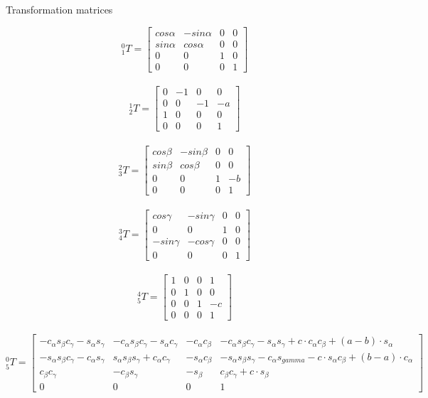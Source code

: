 \documentclass[12pt]{article}
\begin{document}
\medskip

Transformation matrices

\[^0_{1}T=\left[
\begin{array}{cccc}
cos\alpha & -sin \alpha & 0 & 0 \\
sin \alpha & cos \alpha & 0 & 0 \\
0 & 0 & 1 & 0 \\
0 & 0 & 0 & 1
\end{array} \right]\]
\
\[^1_{2}T=\left[
\begin{array}{cccc}
0 & -1 & 0 & 0 \\
0 & 0 & -1 & -a \\
1 & 0 & 0 & 0\\
0 & 0 & 0 & 1
\end{array} \right]\]
\
\[^2_{3}T=\left[
\begin{array}{cccc}
cos\beta & -sin\beta & 0 & 0 \\
sin\beta & cos\beta & 0 & 0 \\
0 & 0 & 1 & -b\\
0 & 0 & 0 & 1
\end{array} \right]\] 
\
\[^3_{4}T=\left[
\begin{array}{cccc}
cos \gamma & -sin \gamma & 0 & 0 \\
0 & 0 & 1 & 0 \\
- sin \gamma & - cos \gamma & 0 & 0\\
0 & 0 & 0 & 1
\end{array} \right]\] 
\
\[^4_{5}T=\left[
\begin{array}{cccc}
1 & 0 & 0 & 1 \\
0 & 1 & 0 & 0 \\
0 & 0 & 1 & -c\\
0 & 0 & 0 & 1
\end{array} \right]\] 
\
\[^0_{5}T=\left[
\begin{array}{cccc}
-c_{\alpha}s_{\beta}c_{\gamma} - s_{\alpha}s_{\gamma} & -c_{\alpha}s_{\beta}c_{\gamma} - s_{\alpha}c_{\gamma} & -c_{\alpha}c_{\beta} & -c_{\alpha}s_{\beta}c_{\gamma} - s_{\alpha}s_{\gamma} + c \cdot c_{\alpha}c_{\beta} +(a - b) \cdot s_{\alpha} \\
-s_{\alpha}s_{\beta}c_{\gamma} - c_{\alpha}s_{\gamma} & s_{\alpha}s_{\beta}s_{\gamma} + c_{\alpha}c_{\gamma} & -s_{\alpha}c_{\beta} & -s_{\alpha}s_{\beta}s_{\gamma} - c_{\alpha}s_{gamma} - c \cdot s_{\alpha}c_{\beta} + (b - a) \cdot c_{\alpha} \\
c_{\beta}c_{\gamma} & -c_{\beta}s_{\gamma} & -s_{\beta} & c_{\beta}c_{\gamma} + c \cdot s_{\beta} \\
0 & 0 & 0 & 1
\end{array} \right]\] 
\end{document}
